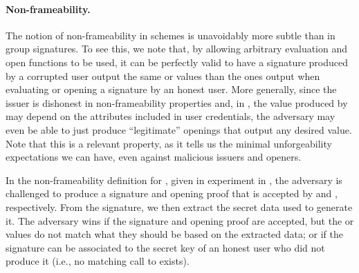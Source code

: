 \paragraph{Non-frameability.} %
The notion of non-frameability in \UAS schemes is unavoidably more subtle than
in group signatures. To see this, we note that, by allowing arbitrary
evaluation and open functions to be used, it can be perfectly valid to
have a signature produced by a corrupted user output the same \yeval or \yinsp
values than the ones output when evaluating or opening a signature by an honest
user.
%
More generally, since the issuer is dishonest in non-frameability properties
and, in \UAS, the value produced by \Open may depend on the attributes
included in user credentials, the adversary may even be able to just produce
``legitimate'' openings that output any desired value. Note that this is a
relevant property, as it tells us the minimal unforgeability expectations we
can have, even against malicious issuers and openers.

In the non-frameability definition for \UAS, given in experiment \ExpNonframe in
, the adversary is challenged to produce a signature
and opening proof that is accepted by \Verify and \Judge, respectively. From
the signature, we then extract the secret data used to generate it. The
adversary wins if the signature and opening proof are accepted, but the \yeval
or \yinsp values do not match what they should be based on the extracted data;
or if the signature can be associated to the secret key of an honest user who
did not produce it (i.e., no matching call to \SIGN exists).

